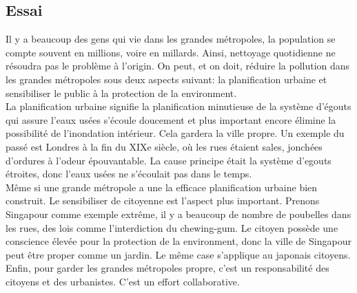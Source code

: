 \documentclass{book}
\begin{document}
        \subsection{Essai}
            Il y a beaucoup des gens qui vie dans les grandes métropoles, la population se compte souvent en millions, voire en millards.
            Ainsi, nettoyage quotidienne ne résoudra pas le problème à l'origin.
            On peut, et on doit, réduire la pollution dans les grandes métropoles sous deux aspects suivant: la planification urbaine et sensibiliser le public à la protection de la environment.
            \\
            La planification urbaine signifie la planification minutieuse de la système d'égouts qui assure l'eaux usées s'écoule doucement et plus important encore élimine la possibilité de l'inondation intérieur.
            Cela gardera la ville propre. Un exemple du passé est Londres à la fin du XIXe siècle, où les rues étaient sales, jonchées d'ordures à l'odeur épouvantable.
            La cause principe était la système d'egouts étroites, donc l'eaux usées ne s'écoulait pas dans le temps.
            \\
            Même si une grande métropole a une la efficace planification urbaine bien construit. 
            Le sensibiliser de citoyenne est l'aspect plus important. 
            Prenons Singapour comme exemple extrême, il y a beaucoup de nombre de poubelles dans les rues,
            des lois comme l'interdiction du chewing-gum. Le citoyen possède une conscience élevée pour la protection de la environment, 
            donc la ville de Singapour peut être proper comme un jardin.
            Le même case s'applique au japonais citoyens.
            \\
            Enfin, pour garder les grandes métropoles propre, c'est un responsabilité des citoyens et des urbanistes. C'est un effort collaborative.
\end{document}
